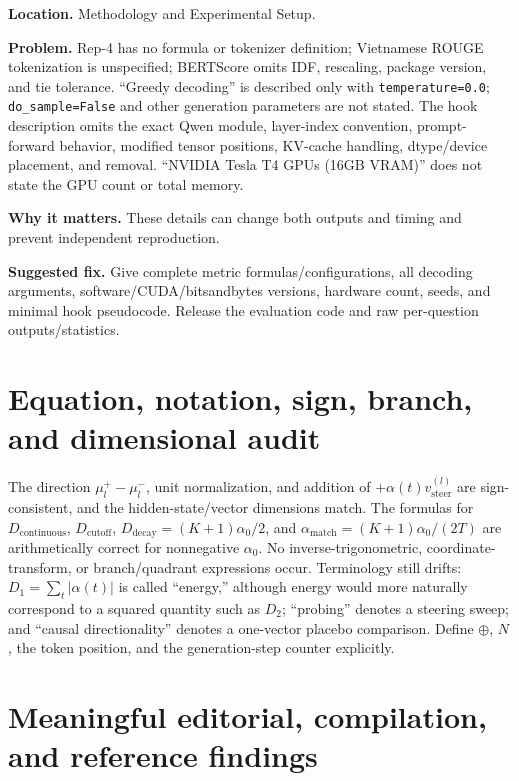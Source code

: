 \documentclass[11pt]{article}
\newcommand{\findinglabel}[1]{\textbf{#1}}
\begin{document}
\findinglabel{Location.} Methodology and Experimental Setup.

\findinglabel{Problem.} Rep-4 has no formula or tokenizer definition; Vietnamese ROUGE tokenization is unspecified; BERTScore omits IDF, rescaling, package version, and tie tolerance.  ``Greedy decoding'' is described only with \texttt{temperature=0.0}; \texttt{do\_sample=False} and other generation parameters are not stated.  The hook description omits the exact Qwen module, layer-index convention, prompt-forward behavior, modified tensor positions, KV-cache handling, dtype/device placement, and removal.  ``NVIDIA Tesla T4 GPUs (16GB VRAM)'' does not state the GPU count or total memory.

\findinglabel{Why it matters.} These details can change both outputs and timing and prevent independent reproduction.

\findinglabel{Suggested fix.} Give complete metric formulas/configurations, all decoding arguments, software/CUDA/bitsandbytes versions, hardware count, seeds, and minimal hook pseudocode.  Release the evaluation code and raw per-question outputs/statistics.

\section*{Equation, notation, sign, branch, and dimensional audit}

The direction $\mu_l^+-\mu_l^-$, unit normalization, and addition of $+\alpha(t)v_{\mathrm{steer}}^{(l)}$ are sign-consistent, and the hidden-state/vector dimensions match.  The formulas for $D_{\mathrm{continuous}}$, $D_{\mathrm{cutoff}}$, $D_{\mathrm{decay}}=(K+1)\alpha_0/2$, and $\alpha_{\mathrm{match}}=(K+1)\alpha_0/(2T)$ are arithmetically correct for nonnegative $\alpha_0$.  No inverse-trigonometric, coordinate-transform, or branch/quadrant expressions occur.  Terminology still drifts: $D_1=\sum_t|\alpha(t)|$ is called ``energy,'' although energy would more naturally correspond to a squared quantity such as $D_2$; ``probing'' denotes a steering sweep; and ``causal directionality'' denotes a one-vector placebo comparison.  Define $\oplus$, $N$, the token position, and the generation-step counter explicitly.

\section*{Meaningful editorial, compilation, and reference findings}
\end{document}
